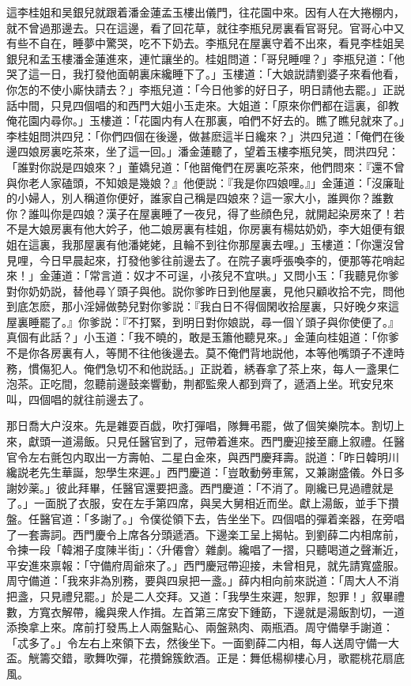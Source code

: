 這李桂姐和吴銀兒就跟着潘金蓮孟玉樓出儀門，往花園中來。因有人在大捲棚内，就不曾過那邊去。只在這邊，看了回花草，就往李瓶兒房裏看官哥兒。官哥心中又有些不自在，睡夢中驚哭，吃不下奶去。李瓶兒在屋裏守着不出來，看見李桂姐吴銀兒和孟玉樓潘金蓮進來，連忙讓坐的。桂姐問道：「哥兒睡哩？」李瓶兒道：「他哭了這一日，我打發他面朝裏床纔睡下了。」玉樓道：「大娘説請劉婆子來看他看，你怎的不使小廝快請去？」李瓶兒道：「今日他爹的好日子，明日請他去罷。」正説話中間，只見四個唱的和西門大姐小玉走來。大姐道：「原來你們都在這裏，卻教俺花園内尋你。」玉樓道：「花園内有人在那裏，咱們不好去的。瞧了瞧兒就來了。」李桂姐問洪四兒：「你們四個在後邊，做甚麽這半日纔來？」洪四兒道：「俺們在後邊四娘房裏吃茶來，坐了這一回。」潘金蓮聽了，望着玉樓李瓶兒笑，問洪四兒：「誰對你説是四娘來？」董嬌兒道：「他㽞俺們在房裏吃茶來，他們問來：『還不曾與你老人家磕頭，不知娘是幾娘？』他便説：『我是你四娘哩。』」金蓮道：「沒廉耻的小婦人，別人稱道你便好，誰家自己稱是四娘來？這一家大小，誰興你？誰數你？誰叫你是四娘？漢子在屋裏睡了一夜兒，得了些顔色兒，就開起染房來了！若不是大娘房裏有他大妗子，他二娘房裏有桂姐，你房裏有楊姑奶奶，李大姐便有銀姐在這裏，我那屋裏有他潘姥姥，且輪不到往你那屋裏去哩。」玉樓道：「你還沒曾見哩，今日早晨起來，打發他爹往前邊去了。在院子裏呼張喚李的，便那等花哨起來！」金蓮道：「常言道：奴才不可逞，小孩兒不宜哄。」又問小玉：「我聽見你爹對你奶奶説，替他尋丫頭子與他。説你爹昨日到他屋裏，見他只顧收拾不完，問他到底怎麽，那小淫婦做勢兒對你爹説：『我白日不得個閑收拾屋裏，只好晚夕來這屋裏睡罷了。』你爹説：『不打緊，到明日對你娘説，尋一個丫頭子與你使便了。』真個有此話？」小玉道：「我不曉的，敢是玉簫他聽見來。」金蓮向桂姐道：「你爹不是你各房裏有人，等閒不往他後邊去。莫不俺們背地説他，本等他嘴頭子不達時務，慣傷犯人。俺們急切不和他説話。」正説着，綉春拿了茶上來，每人一盞果仁泡茶。正吃間，忽聽前邊鼓楽響動，荆都監衆人都到齊了，遞酒上坐。玳安兒來叫，四個唱的就往前邊去了。

那日喬大户沒來。先是雜耍百戯，吹打彈唱，隊舞弔罷，做了個笑樂院本。割切上來，獻頭一道湯飯。只見任醫官到了，冠帶着進來。西門慶迎接至廳上叙禮。任醫官令左右氈包内取出一方壽帕、二星白金來，與西門慶拜壽。説道：「昨日韓明川纔説老先生華誕，恕學生來遲。」西門慶道：「豈敢動勞車駕，又兼謝盛儀。外日多謝妙薬。」彼此拜畢，任醫官還要把盞。西門慶道：「不消了。剛纔已見過禮就是了。」一面脱了衣服，安在左手第四席，與吴大舅相近而坐。獻上湯飯，並手下攢盤。任醫官道：「多謝了。」令僕從領下去，告坐坐下。四個唱的彈着楽器，在旁唱了一套壽詞。西門慶令上席各分頭遞酒。下邊楽工呈上揭帖。到劉薛二内相席前，令揀一段「韓湘子度陳半街」：〈升僊會〉雜劇。纔唱了一摺，只聽喝道之聲漸近，平安進來禀報：「守備府周爺來了。」西門慶冠帶迎接，未曾相見，就先請寬盛服。周守備道：「我來非為別務，要與四泉把一盞。」薛内相向前來説道：「周大人不消把盞，只見禮兒罷。」於是二人交拜。又道：「我學生來遲，恕罪，恕罪！」叙畢禮數，方寬衣解帶，纔與衆人作揖。左首第三席安下鍾筯，下邊就是湯飯割切，一道添換拿上來。席前打發馬上人兩盤點心、兩盤熟肉、兩瓶酒。周守備擧手謝道：「忒多了。」令左右上來領下去，然後坐下。一面劉薛二内相，每人送周守備一大盃。觥籌交錯，歌舞吹彈，花攢錦簇飲酒。正是：舞低楊柳樓心月，歌罷桃花扇底風。

